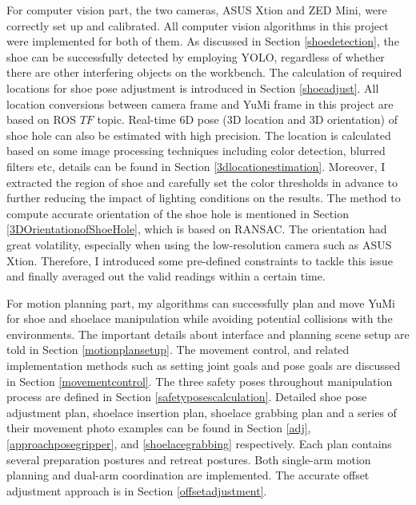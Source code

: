 For computer vision part, the two cameras, ASUS Xtion and ZED Mini, were correctly set up and calibrated. All computer vision algorithms in this project were implemented for both of them. As discussed in Section \ref{shoedetection}, the shoe can be successfully detected by employing YOLO, regardless of whether there are other interfering objects on the workbench. The calculation of required locations for shoe pose adjustment is introduced in Section \ref{shoeadjust}. All location conversions between camera frame and YuMi frame in this project are based on ROS $TF$ topic. Real-time 6D pose (3D location and 3D orientation) of shoe hole can also be estimated with high precision. The location is calculated based on some image processing techniques including color detection, blurred filters etc, details can be found in Section \ref{3dlocationestimation}. Moreover, I extracted the region of shoe and carefully set the color thresholds in advance to further reducing the impact of lighting conditions on the results. The method to compute accurate orientation of the shoe hole is mentioned in Section \ref{3DOrientationofShoeHole}, which is based on RANSAC. The orientation had great volatility, especially when using the low-resolution camera such as ASUS Xtion. Therefore, I introduced some pre-defined constraints to tackle this issue and finally averaged out the valid readings within a certain time.

For motion planning part, my algorithms can successfully plan and move YuMi for shoe and shoelace manipulation while avoiding potential collisions with the environments. The important details about interface and planning scene setup are told in Section \ref{motionplansetup}. The movement control, and related implementation methods such as setting joint goals and pose goals are discussed in Section \ref{movementcontrol}. The three safety poses throughout manipulation process are defined in Section \ref{safetyposescalculation}. Detailed shoe pose adjustment plan, shoelace insertion plan, shoelace grabbing plan and a series of their movement photo examples can be found in Section \ref{adj}, \ref{approachposegripper}, and \ref{shoelacegrabbing} respectively. Each plan contains several preparation postures and retreat postures. Both single-arm motion planning and dual-arm coordination are implemented. The accurate offset adjustment approach is in Section \ref{offsetadjustment}.


